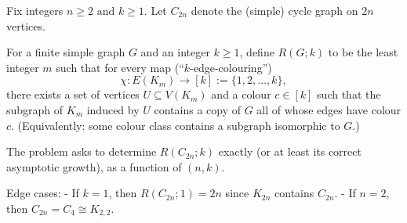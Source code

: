 Fix integers $n\ge 2$ and $k\ge 1$. Let $C_{2n}$ denote the (simple) cycle graph on $2n$ vertices.

For a finite simple graph $G$ and an integer $k\ge 1$, define $R(G;k)$ to be the least integer $m$ such that for every map (``$k$-edge-colouring'')
\[
\chi:E(K_m)\to [k]:=\{1,2,\dots,k\},
\]
there exists a set of vertices $U\subseteq V(K_m)$ and a colour $c\in [k]$ such that the subgraph of $K_m$ induced by $U$ contains a copy of $G$ all of whose edges have colour $c$.
(Equivalently: some colour class contains a subgraph isomorphic to $G$.)

The problem asks to determine $R(C_{2n};k)$ exactly (or at least its correct asymptotic growth), as a function of $(n,k)$.

Edge cases:
- If $k=1$, then $R(C_{2n};1)=2n$ since $K_{2n}$ contains $C_{2n}$.
- If $n=2$, then $C_{2n}=C_4\cong K_{2,2}$.
